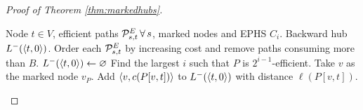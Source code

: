 \begin{proof}[Proof of Theorem \ref{thm:markedhubs}]
\begin{algorithm}[!h]
\caption{Construction of backward hub}
\label{alg:backwardhub}
\begin{algorithmic}[1]
\Require Node $t\in V$, efficient paths $\mathcal{P}_{s,t}^E\,\forall\,s$, marked nodes and EPHS $C_i$.
\Ensure Backward hub $L^-(\langle t,0\rangle)$.
\State Order each $\mathcal{P}_{s,t}^E$ by increasing cost and remove paths consuming more than $B$.
\State $L^-(\langle t,0\rangle)\gets \varnothing$
		\State Find the largest $i$ such that $P$ is $2^{i-1}$-efficient.
		\State Take $v$ as the marked node $v_P$.
		\State Add $\langle v,c(P[v,t])\rangle$ to $L^-(\langle t,0\rangle)$ with distance $\ell(P[v,t])$.
	\EndFor
\EndFor
\end{algorithmic}
\end{algorithm}
\end{proof}